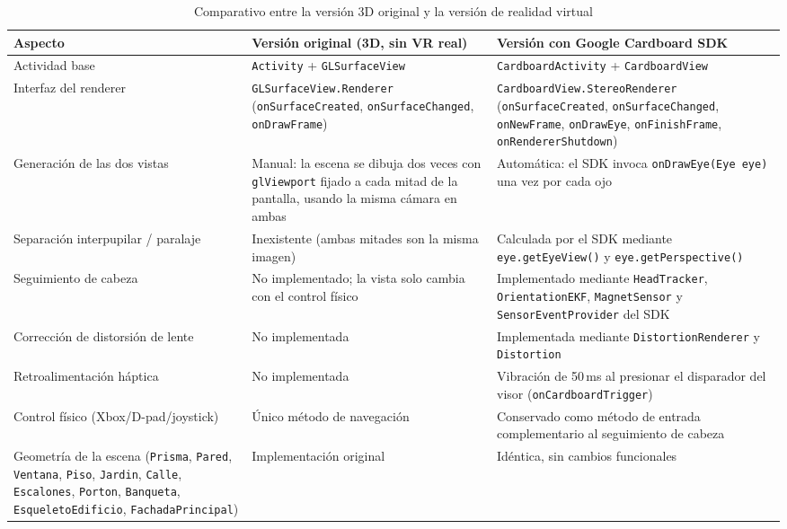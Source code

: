 \documentclass[conference]{IEEEtran}
\begin{document}
	\begin{table}[!t]
		\caption{Comparativo entre la versión 3D original y la versión de realidad virtual}
		\label{tab:comparativo}
		\centering
		\begin{tabular}{|p{4.2cm}|p{5.8cm}|p{6.5cm}|}
			\hline
			\textbf{Aspecto} & \textbf{Versión original (3D, sin VR real)} & \textbf{Versión con Google Cardboard SDK} \\
			\hline
			Actividad base & \texttt{Activity} + \texttt{GLSurfaceView} & \texttt{CardboardActivity} + \texttt{CardboardView} \\
			\hline
			Interfaz del renderer & \texttt{GLSurfaceView.Renderer} (\texttt{onSurfaceCreated}, \texttt{onSurfaceChanged}, \texttt{onDrawFrame}) & \texttt{CardboardView.StereoRenderer} (\texttt{onSurfaceCreated}, \texttt{onSurfaceChanged}, \texttt{onNewFrame}, \texttt{onDrawEye}, \texttt{onFinishFrame}, \texttt{onRendererShutdown}) \\
			\hline
			Generación de las dos vistas & Manual: la escena se dibuja dos veces con \texttt{glViewport} fijado a cada mitad de la pantalla, usando la misma cámara en ambas & Automática: el SDK invoca \texttt{onDrawEye(Eye eye)} una vez por cada ojo \\
			\hline
			Separación interpupilar / paralaje & Inexistente (ambas mitades son la misma imagen) & Calculada por el SDK mediante \texttt{eye.getEyeView()} y \texttt{eye.getPerspective()} \\
			\hline
			Seguimiento de cabeza & No implementado; la vista solo cambia con el control físico & Implementado mediante \texttt{HeadTracker}, \texttt{OrientationEKF}, \texttt{MagnetSensor} y \texttt{SensorEventProvider} del SDK \\
			\hline
			Corrección de distorsión de lente & No implementada & Implementada mediante \texttt{DistortionRenderer} y \texttt{Distortion} \\
			\hline
			Retroalimentación háptica & No implementada & Vibración de 50\,ms al presionar el disparador del visor (\texttt{onCardboardTrigger}) \\
			\hline
			Control físico (Xbox/D-pad/joystick) & Único método de navegación & Conservado como método de entrada complementario al seguimiento de cabeza \\
			\hline
			Geometría de la escena (\texttt{Prisma}, \texttt{Pared}, \texttt{Ventana}, \texttt{Piso}, \texttt{Jardin}, \texttt{Calle}, \texttt{Escalones}, \texttt{Porton}, \texttt{Banqueta}, \texttt{EsqueletoEdificio}, \texttt{FachadaPrincipal}) & Implementación original & Idéntica, sin cambios funcionales \\
			\hline
		\end{tabular}
	\end{table}
	
\end{document}
